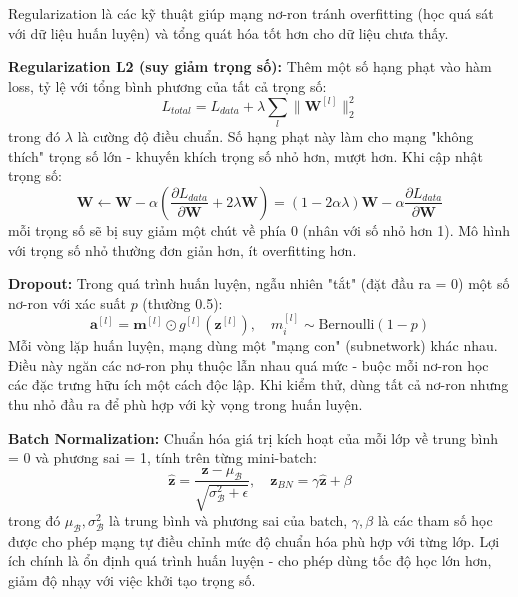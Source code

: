 Regularization là các kỹ thuật giúp mạng nơ-ron tránh overfitting (học quá sát với dữ liệu huấn luyện) và tổng quát hóa tốt hơn cho dữ liệu chưa thấy.

\textbf{Regularization L2 (suy giảm trọng số):} Thêm một số hạng phạt vào hàm loss, tỷ lệ với tổng bình phương của tất cả trọng số:
\begin{equation}
L_{total} = L_{data} + \lambda \sum_{l} \|\mathbf{W}^{[l]}\|_2^2
\end{equation}
trong đó $\lambda$ là cường độ điều chuẩn. Số hạng phạt này làm cho mạng "không thích" trọng số lớn - khuyến khích trọng số nhỏ hơn, mượt hơn. Khi cập nhật trọng số:
\begin{equation}
\mathbf{W} \leftarrow \mathbf{W} - \alpha \left(\frac{\partial L_{data}}{\partial \mathbf{W}} + 2\lambda \mathbf{W}\right) = (1 - 2\alpha\lambda)\mathbf{W} - \alpha \frac{\partial L_{data}}{\partial \mathbf{W}}
\end{equation}
mỗi trọng số sẽ bị suy giảm một chút về phía 0 (nhân với số nhỏ hơn 1). Mô hình với trọng số nhỏ thường đơn giản hơn, ít overfitting hơn.

\textbf{Dropout:} Trong quá trình huấn luyện, ngẫu nhiên "tắt" (đặt đầu ra = 0) một số nơ-ron với xác suất $p$ (thường 0.5):
\begin{equation}
\mathbf{a}^{[l]} = \mathbf{m}^{[l]} \odot g^{[l]}(\mathbf{z}^{[l]}), \quad m_i^{[l]} \sim \text{Bernoulli}(1-p)
\end{equation}
Mỗi vòng lặp huấn luyện, mạng dùng một "mạng con" (subnetwork) khác nhau. Điều này ngăn các nơ-ron phụ thuộc lẫn nhau quá mức - buộc mỗi nơ-ron học các đặc trưng hữu ích một cách độc lập. Khi kiểm thử, dùng tất cả nơ-ron nhưng thu nhỏ đầu ra để phù hợp với kỳ vọng trong huấn luyện.

\textbf{Batch Normalization:} Chuẩn hóa giá trị kích hoạt của mỗi lớp về trung bình = 0 và phương sai = 1, tính trên từng mini-batch:
\begin{equation}
\hat{\mathbf{z}} = \frac{\mathbf{z} - \mu_{\mathcal{B}}}{\sqrt{\sigma_{\mathcal{B}}^2 + \epsilon}}, \quad \mathbf{z}_{BN} = \gamma \hat{\mathbf{z}} + \beta
\end{equation}
trong đó $\mu_{\mathcal{B}}, \sigma_{\mathcal{B}}^2$ là trung bình và phương sai của batch, $\gamma, \beta$ là các tham số học được cho phép mạng tự điều chỉnh mức độ chuẩn hóa phù hợp với từng lớp. Lợi ích chính là ổn định quá trình huấn luyện - cho phép dùng tốc độ học lớn hơn, giảm độ nhạy với việc khởi tạo trọng số.


